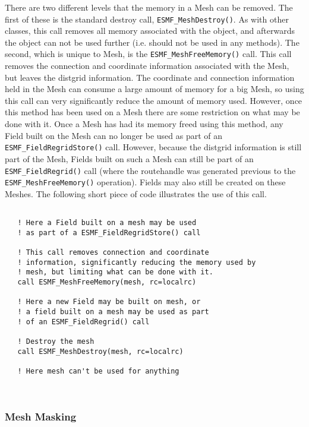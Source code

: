    There are two different levels that the memory in a Mesh can be removed. The first of these is the standard destroy call, 
   {\tt ESMF\_MeshDestroy()}. As with other classes, this call removes all memory associated with the object, and afterwards  
   the object can not be used further (i.e. should not be used in any methods). The second, which is unique to Mesh, is the 
   {\tt ESMF\_MeshFreeMemory()} call. This call removes the connection and coordinate information associated with the Mesh, but
   leaves the distgrid information. The coordinate and connection information held in the Mesh can consume a large amount of memory
   for a big Mesh, so using this call can very significantly reduce the amount of memory used. However, once this method
   has been used on a Mesh there are some restriction on what may be done with it. Once a Mesh has had its memory freed using this method, 
   any Field built on the Mesh can no longer be used as part of an {\tt ESMF\_FieldRegridStore()} call. However, because the distgrid 
   information is still part of the Mesh, Fields built on such a Mesh can still be part of an {\tt ESMF\_FieldRegrid()}
   call (where the routehandle was generated previous to the {\tt ESMF\_MeshFreeMemory()} operation). Fields may also 
   still be created on these Meshes. The following short piece of code illustrates the use of this call.
   

 \begin{verbatim}

   ! Here a Field built on a mesh may be used
   ! as part of a ESMF_FieldRegridStore() call

   ! This call removes connection and coordinate 
   ! information, significantly reducing the memory used by
   ! mesh, but limiting what can be done with it.
   call ESMF_MeshFreeMemory(mesh, rc=localrc)

   ! Here a new Field may be built on mesh, or
   ! a field built on a mesh may be used as part
   ! of an ESMF_FieldRegrid() call

   ! Destroy the mesh
   call ESMF_MeshDestroy(mesh, rc=localrc)

   ! Here mesh can't be used for anything

 
\end{verbatim}
 

  \subsubsection{Mesh Masking}\label{sec:mesh:mask}
  
